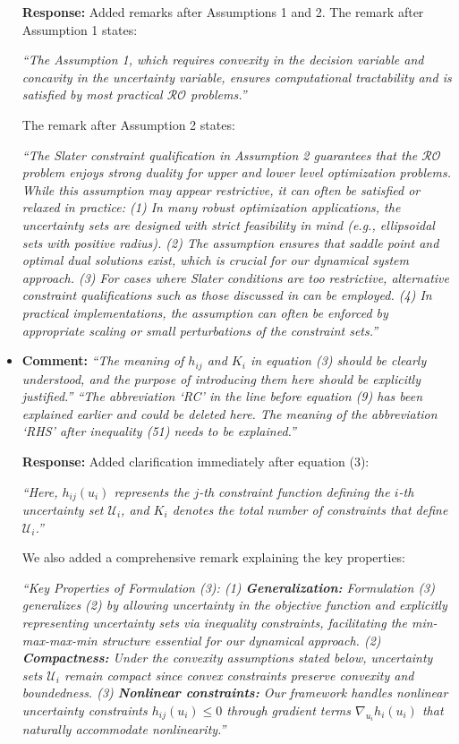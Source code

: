 \documentclass[journal,twoside,web]{ieeecolor}
\begin{document}
\begin{itemize}
\textbf{Response:} Added remarks after Assumptions 1 and 2. The remark after Assumption 1 states: 

{\color{revisionblue}\textit{``The Assumption 1, which requires convexity in the decision variable and concavity in the uncertainty variable, ensures computational tractability and is satisfied by most practical $\mathcal{RO}$ problems.''}}

The remark after Assumption 2 states:

{\color{revisionblue}\textit{``The Slater constraint qualification in Assumption 2 guarantees that the $\mathcal{RO}$ problem enjoys strong duality for upper and lower level optimization problems. While this assumption may appear restrictive, it can often be satisfied or relaxed in practice: (1) In many robust optimization applications, the uncertainty sets are designed with strict feasibility in mind (e.g., ellipsoidal sets with positive radius). (2) The assumption ensures that saddle point and optimal dual solutions exist, which is crucial for our dynamical system approach. (3) For cases where Slater conditions are too restrictive, alternative constraint qualifications such as those discussed in \cite{jeyakumar2010} can be employed. (4) In practical implementations, the assumption can often be enforced by appropriate scaling or small perturbations of the constraint sets.''}}

\item  \textbf{Comment:} \textit{``The meaning of $h_{ij}$ and $K_i$ in equation (3) should be clearly understood, and the purpose of introducing them here should be explicitly justified.'' ``The abbreviation `RC' in the line before equation (9) has been explained earlier and could be deleted here. The meaning of the abbreviation `RHS' after inequality (51) needs to be explained.''}

\textbf{Response:} Added clarification immediately after equation (3): 

{\color{revisionblue}\textit{``Here, $h_{ij}(u_i)$ represents the $j$-th constraint function defining the $i$-th uncertainty set $\mathcal{U}_i$, and $K_i$ denotes the total number of constraints that define $\mathcal{U}_i$.''}}

We also added a comprehensive remark explaining the key properties:

{\color{revisionblue}\textit{``Key Properties of Formulation (3): (1) \textbf{Generalization:} Formulation (3) generalizes (2) by allowing uncertainty in the objective function and explicitly representing uncertainty sets via inequality constraints, facilitating the min-max-max-min structure essential for our dynamical approach. (2) \textbf{Compactness:} Under the convexity assumptions stated below, uncertainty sets $\mathcal{U}_i$ remain compact since convex constraints preserve convexity and boundedness. (3) \textbf{Nonlinear constraints:} Our framework handles nonlinear uncertainty constraints $h_{ij}(u_i) \leq 0$ through gradient terms $\nabla_{u_i} h_i(u_i)$ that naturally accommodate nonlinearity.''}}


\end{itemize}
\end{document}
